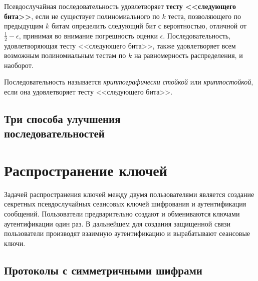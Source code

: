 \documentclass[10pt,a4paper]{book}
\begin{document}
Псевдослучайная последовательность удовлетворяет \textbf{тесту <<следующего бита>>}, если не существует полиномиального по $k$ теста, позволяющего по предыдущим $k$ битам определить следующий бит с вероятностью, отличной от $\frac{1}{2} - \epsilon$, принимая во внимание погрешность оценки $\epsilon$. Последовательность, удовлетворяющая тесту <<следующего бита>>, также удовлетворяет всем возможным полиномиальным тестам по $k$ на равномерность распределения, и наоборот.

Последовательность называется \emph{криптографически стойкой} или \emph{криптостойкой}, если она удовлетворяет тесту <<следующего бита>>.



%



\section[Три способа улучшения последовательностей]{Три способа улучшения \protect\\ последовательностей}











\chapter{Распространение ключей}

Задачей распространения ключей между двумя пользователями является создание секретных псевдослучайных сеансовых ключей шифрования и аутентификация сообщений. Пользователи предварительно создают и обмениваются ключами аутентификации один раз. В дальнейшем для создания защищенной связи пользователи производят взаимную аутентификацию и вырабатывают сеансовые ключи.



\section{Протоколы с симметричными шифрами}
\end{document}
